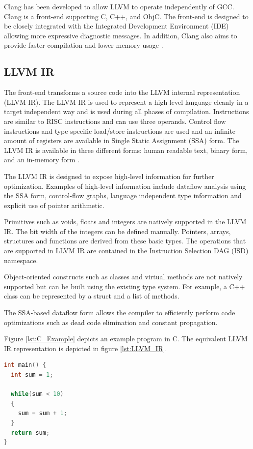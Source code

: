 Clang has been developed to allow LLVM to operate independently of GCC. Clang is a front-end supporting C, C++, and ObjC. The front-end is designed to be closely integrated with the Integrated Development Environment (IDE) allowing more expressive diagnostic messages. In addition, Clang also aims to provide faster compilation and lower memory usage \cite{clang:features}.

\subsection{LLVM IR}
The front-end transforms a source code into the LLVM internal representation (LLVM IR). The LLVM IR is used to represent a high level language cleanly in a target independent way and is used during all phases of compilation. Instructions are similar to RISC instructions and can use three operands. Control flow instructions and type specific load/store instructions are used and an infinite amount of registers are available in Single Static Assignment (SSA) form. The LLVM IR is available in three different forms: human readable text, binary form, and an in-memory form \cite{llvm:presentation}.

The LLVM IR is designed to expose high-level information for further optimization. Examples of high-level information include dataflow analysis using the SSA form, control-flow graphs, language independent type information and explicit use of pointer arithmetic. 

Primitives such as voids, floats and integers are natively supported in the LLVM IR. The bit width of the integers can be defined manually. Pointers, arrays, structures and functions are derived from these basic types. The operations that are supported in LLVM IR are contained in the Instruction Selection DAG (ISD) namespace.

Object-oriented constructs such as classes and virtual methods are not natively supported but can be built using the existing type system. For example, a C++ class can be represented by a struct and a list of methods. 

The SSA-based dataflow form allows the compiler to efficiently perform code optimizations such as dead code elimination and constant propagation. 

Figure \ref{lst:C_Example} depicts an example program in C. The equivalent LLVM IR representation is depicted in figure \ref{lst:LLVM_IR}.

\lstset{numbers=none, captionpos=b}
\begin{lstlisting}[language=C,caption={C example program},label=lst:C_Example]
int main() {
  int sum = 1;

  while(sum < 10)
  {
    sum = sum + 1;
  }
  return sum;
}
\end{lstlisting}


